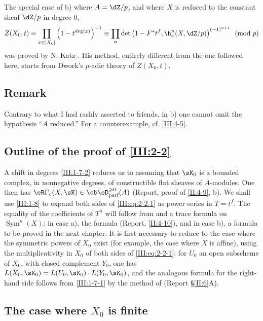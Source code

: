 \documentclass[oneside]{book}
\begin{document}
The special case of b) where $A=\dZ/p$, and where $X$ is reduced to the
constant sheaf $\dZ/p$ in degree $0$,
\[
  Z(X_0,t) = \prod_{x\in |X_0|} \left(1-t^{\deg(x)}\right)^{-1}
      \equiv \prod_n \det\left(1-F^* t^f,\h_c^n(X,\dZ/p)\right)^{(-1)^{n+1}} \pmod p
\]
was proved by N. Katz \cite[XXII 3.1]{sga7}. His method, entirely different
from the one followed here, starts from Dwork's $p$-adic theory of
$Z(X_0,t)$.






\subsection{Remark}\label{III:2-7}


Contrary to what I had rashly asserted to friends, in b) one cannot omit the
hypothesis ``$A$ reduced.'' For a counterexample, cf. \ref{III:4-5}.






\subsection{Outline of the proof of \ref{III:2-2}}\label{III:2-8}

A shift in degrees \ref{III:1-7-2} reduces us to assuming that $\sK_0$ is a
bounded complex, in nonnegative degrees, of constructible flat sheaves of
$A$-modules. One then has
$\eR\Gamma_c(X,\sK)\in \ob\eD_\text{parf}^{\geqslant 0}(A)$ (Report, proof of
\ref{II:4-9}, b). We shall use \ref{III:1-8} to expand both sides of
\eqref{III:eq:2-2-1} as power series in $T=t^f$. The equality of the
coefficients of $T^n$ will follow from \cite[XVII 5.5.21]{sga4} and a trace
formula on $\operatorname{Sym}^n(X)$: in case a), the formula (Report,
\ref{II:4-10}), and in case b), a formula to be proved in the next chapter.
It is first necessary to reduce to the case where the symmetric powers of
$X_0$ exist (for example, the case where $X$ is affine), using the
multiplicativity in $X_0$ of both sides of \eqref{III:eq:2-2-1}: for $U_0$ an
open subscheme of $X_0$, with closed complement $Y_0$, one has
$L(X_0,\sK_0)=L(U_0,\sK_0)\cdot L(Y_0,\sK_0)$, and the analogous formula for
the right-hand side follows from \ref{III:1-7-1} by the method of (Report
\S\ref{II:6}A).






\subsection{The case where $X_0$ is finite}\label{III:2-9}
\end{document}
